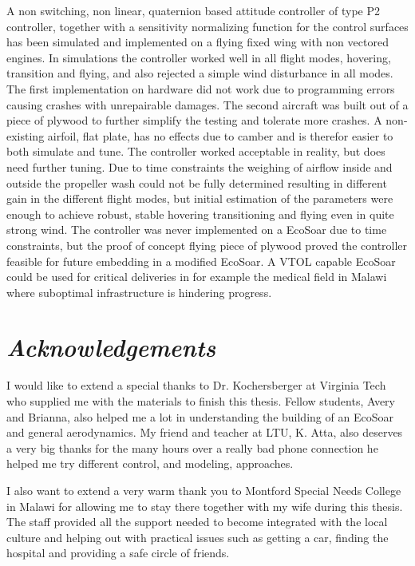 \documentclass{article}
\begin{document}
\abstract
A non switching, non linear, quaternion based attitude controller of type P2 controller, together with a sensitivity normalizing function for the control surfaces has been simulated and implemented on a flying fixed wing with non vectored engines.
In simulations the controller worked well in all flight modes, hovering, transition and flying, and also rejected a simple wind disturbance in all modes.
The first implementation on hardware did not work due to programming errors causing crashes with unrepairable damages.
The second aircraft was built out of a piece of plywood to further simplify the testing and tolerate more crashes.
A non-existing airfoil, flat plate, has no effects due to camber and is therefor easier to both simulate and tune.
The controller worked acceptable in reality, but does need further tuning.
Due to time constraints the weighing of airflow inside and outside the propeller wash could not be fully determined resulting in different gain in the different flight modes, but initial estimation of the parameters were enough to achieve robust, stable hovering transitioning and flying even in quite strong wind. %
The controller was never implemented on a EcoSoar due to time constraints, but the proof of concept flying piece of plywood proved the controller feasible for future embedding in a modified EcoSoar. 
A VTOL capable EcoSoar could be used for critical deliveries in for example the medical field in Malawi where suboptimal infrastructure is hindering progress.

\newpage
\section*{\textit{Acknowledgements}}

I would like to extend a special thanks to Dr. Kochersberger at Virginia Tech who supplied me with the materials to finish this thesis.
Fellow students, Avery and Brianna, also helped me a lot in understanding the building of an EcoSoar and general aerodynamics.
My friend and teacher at LTU, K. Atta, also deserves a very big thanks for the many hours over a really bad phone connection he helped me try different control, and modeling, approaches.

I also want to extend a very warm thank you to Montford Special Needs College in Malawi for allowing me to stay there together with my wife during this thesis.
The staff provided all the support needed to become integrated with the local culture and helping out with practical issues such as getting a car, finding the hospital and providing a safe circle of friends.
\end{document}
